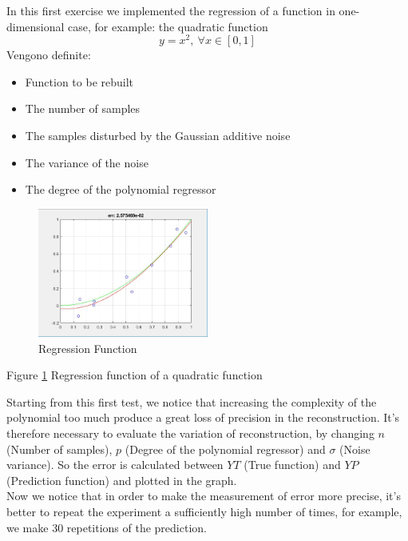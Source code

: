 
In this first exercise we implemented the regression of a function in one-dimensional case, for example: the quadratic function
\[y = x^2,\  \forall x\in[0,1]\]
Vengono definite:

\begin{itemize}

	\item Function to be rebuilt
	\item The number of samples
	\item The samples disturbed by the Gaussian additive noise
	\item The variance of the noise
	\item The degree of the polynomial regressor

\end{itemize}

\begin{figure}[h]
	\centering
	\includegraphics[width=0.5\textwidth]{regression_function.png}
	\caption{Regression Function}
	\label{fig:regression function}
\end{figure}

Figure \ref{fig:regression function} Regression function of a quadratic function

Starting from this first test, we notice that increasing the complexity of the polynomial too much produce a great loss of precision in the reconstruction.
It's therefore necessary to evaluate the variation of reconstruction, by changing $ n $ (Number of samples), $ p $ (Degree of the polynomial regressor) and $ \sigma $ (Noise variance).
So the error is calculated between $ YT $ (True function) and $ YP $ (Prediction function) and plotted in the graph. \\
Now we notice that in order to make the measurement of error more precise, it's better to repeat the experiment a sufficiently high number of times, for example, we make 30 repetitions of the prediction.

